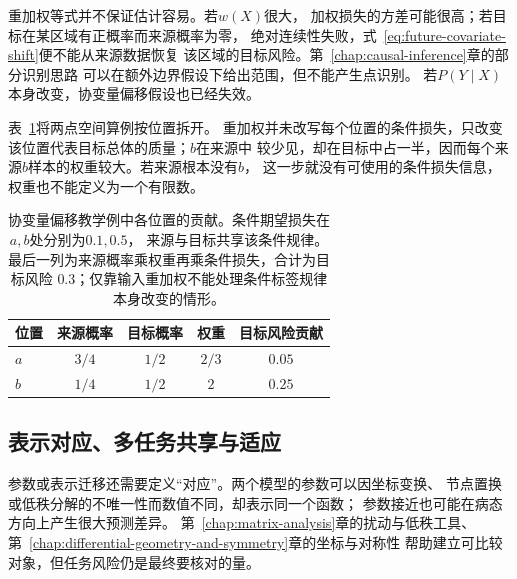 重加权等式并不保证估计容易。若$w(X)$很大，
加权损失的方差可能很高；若目标在某区域有正概率而来源概率为零，
绝对连续性失败，式~\eqref{eq:future-covariate-shift}便不能从来源数据恢复
该区域的目标风险。第~\ref{chap:causal-inference}章的部分识别思路
可以在额外边界假设下给出范围，但不能产生点识别。
若$P(Y\mid X)$本身改变，协变量偏移假设也已经失效。

表~\ref{tab:future-reweighting-contributions}将两点空间算例按位置拆开。
重加权并未改写每个位置的条件损失，只改变该位置代表目标总体的质量；$b$在来源中
较少见，却在目标中占一半，因而每个来源$b$样本的权重较大。若来源根本没有$b$，
这一步就没有可使用的条件损失信息，权重也不能定义为一个有限数。

\begin{table}[htbp]
  \centering
  \begin{tabular}{lcccc}
    \toprule
    位置 & 来源概率 & 目标概率 & 权重 & 目标风险贡献\\
    \midrule
    $a$ & $3/4$ & $1/2$ & $2/3$ & $0.05$\\
    $b$ & $1/4$ & $1/2$ & $2$ & $0.25$\\
    \bottomrule
  \end{tabular}
  \caption{协变量偏移教学例中各位置的贡献。条件期望损失在$a,b$处分别为$0.1,0.5$，
  来源与目标共享该条件规律。最后一列为来源概率乘权重再乘条件损失，合计为目标风险
  $0.3$；仅靠输入重加权不能处理条件标签规律本身改变的情形。}
  \label{tab:future-reweighting-contributions}
\end{table}

\subsection{表示对应、多任务共享与适应}
\label{sec:future-representation-multitask-adaptation}

参数或表示迁移还需要定义“对应”。两个模型的参数可以因坐标变换、
节点置换或低秩分解的不唯一性而数值不同，却表示同一个函数；
参数接近也可能在病态方向上产生很大预测差异。
第~\ref{chap:matrix-analysis}章的扰动与低秩工具、
第~\ref{chap:differential-geometry-and-symmetry}章的坐标与对称性
帮助建立可比较对象，但任务风险仍是最终要核对的量。

